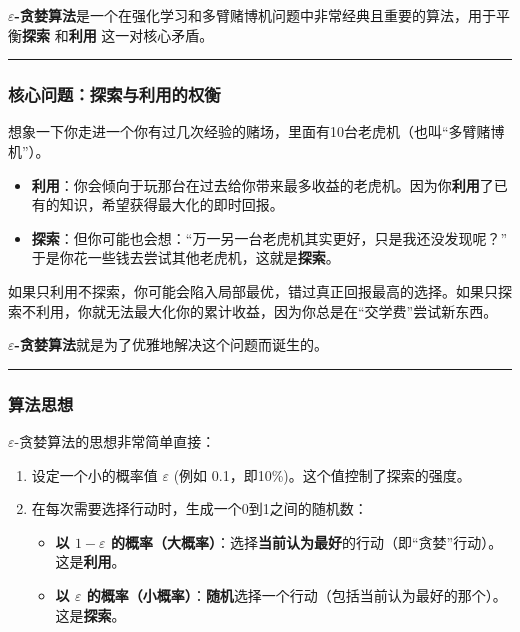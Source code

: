 \documentclass[11pt]{ctexart}
\providecommand{\tightlist}{%
      \setlength{\itemsep}{0pt}\setlength{\parskip}{0pt}}
\begin{document}
\textbf{\(\varepsilon\)-贪婪算法}是一个在强化学习和多臂赌博机问题中非常经典且重要的算法，用于平衡\textbf{探索}
和\textbf{利用} 这一对核心矛盾。

\begin{center}\rule{0.5\linewidth}{0.5pt}\end{center}

\hypertarget{ux6838ux5fc3ux95eeux9898ux63a2ux7d22ux4e0eux5229ux7528ux7684ux6743ux8861}{%
\subsubsection{核心问题：探索与利用的权衡}\label{ux6838ux5fc3ux95eeux9898ux63a2ux7d22ux4e0eux5229ux7528ux7684ux6743ux8861}}

想象一下你走进一个你有过几次经验的赌场，里面有10台老虎机（也叫``多臂赌博机''）。

\begin{itemize}
\tightlist
\item
  \textbf{利用}：你会倾向于玩那台在过去给你带来最多收益的老虎机。因为你\textbf{利用}了已有的知识，希望获得最大化的即时回报。
\item
  \textbf{探索}：但你可能也会想：``万一另一台老虎机其实更好，只是我还没发现呢？''
  于是你花一些钱去尝试其他老虎机，这就是\textbf{探索}。
\end{itemize}

如果只利用不探索，你可能会陷入局部最优，错过真正回报最高的选择。如果只探索不利用，你就无法最大化你的累计收益，因为你总是在``交学费''尝试新东西。

\textbf{\(\varepsilon\)-贪婪算法}就是为了优雅地解决这个问题而诞生的。

\begin{center}\rule{0.5\linewidth}{0.5pt}\end{center}

\hypertarget{ux7b97ux6cd5ux601dux60f3}{%
\subsubsection{算法思想}\label{ux7b97ux6cd5ux601dux60f3}}

\(\varepsilon\)-贪婪算法的思想非常简单直接：

\begin{enumerate}
\def\labelenumi{\arabic{enumi}.}
\tightlist
\item
  设定一个小的概率值 \(\varepsilon\) (例如
  0.1，即10\%)。这个值控制了探索的强度。
\item
  在每次需要选择行动时，生成一个0到1之间的随机数：

  \begin{itemize}
  \tightlist
  \item
    \textbf{以 \(1-\varepsilon\)
    的概率（大概率）}：选择\textbf{当前认为最好}的行动（即``贪婪''行动）。这是\textbf{利用}。
  \item
    \textbf{以 \(\varepsilon\)
    的概率（小概率）}：\textbf{随机}选择一个行动（包括当前认为最好的那个）。这是\textbf{探索}。
  \end{itemize}
\end{enumerate}
\end{document}
